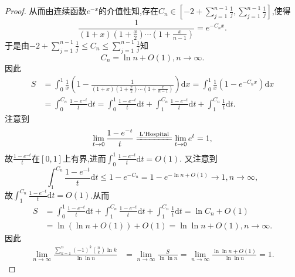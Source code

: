 \documentclass[../../main.tex]{subfiles}%
\begin{document}
\begin{proof}
从而由连续函数$e^{-x}$的介值性知,存在$C_n\in \left[ -2+\sum\limits_{j=1}^{n-1}{\frac{1}{j}},\sum\limits_{j=1}^{n-1}{\frac{1}{j}} \right]$,使得
$$\frac{1}{(1+x)\left(1+\frac{x}{2}\right)\cdots\left(1+\frac{x}{n-1}\right)}=e^{-C_nx}.$$
于是由$-2+\sum\limits_{j=1}^{n-1}{\frac{1}{j}}\leqslant C_n\leqslant \sum\limits_{j=1}^{n-1}{\frac{1}{j}}$知
$$C_n=\ln n+O(1),n\rightarrow \infty.$$
因此
\begin{align*}
S&=\int_0^1{\frac{1}{x}\left( 1-\frac{1}{(1+x)\left(1+\frac{x}{2}\right)\cdots\left(1+\frac{x}{n-1}\right)} \right) \mathrm{d}x}=\int_0^1{\frac{1}{x}\left( 1-e^{-C_nx} \right) \mathrm{d}x}
\\
&=\int_0^{C_n}{\frac{1-e^{-t}}{t}\mathrm{d}t}=\int_0^1{\frac{1-e^{-t}}{t}\mathrm{d}t}+\int_1^{C_n}{\frac{1-e^{-t}}{t}\mathrm{d}t}+\int_1^{C_n}{\frac{1}{t}\mathrm{d}t}.
\end{align*}
注意到
$$\lim_{t\rightarrow 0}\frac{1-e^{-t}}{t}\xlongequal{\text{L'Hospital}}\lim_{t\rightarrow 0}e^t=1,$$
故$\frac{1-e^{-t}}{t}$在$[0,1]$上有界,进而$\int_0^1{\frac{1-e^{-t}}{t}\mathrm{d}t}=O(1)$.
又注意到
$$\int_1^{C_n}{\frac{1-e^{-t}}{t}\mathrm{d}t}\leqslant 1-e^{-C_n}=1-e^{-\ln n+O(1)}\rightarrow 1,n\rightarrow \infty,$$
故$\int_1^{C_n}{\frac{1-e^{-t}}{t}\mathrm{d}t}=O(1)$.从而
\begin{align*}
S&=\int_0^1{\frac{1-e^{-t}}{t}\mathrm{d}t}+\int_1^{C_n}{\frac{1-e^{-t}}{t}\mathrm{d}t}+\int_1^{C_n}{\frac{1}{t}\mathrm{d}t}=\ln C_n+O(1)
\\
&=\ln \left( \ln n+O(1) \right) +O(1)=\ln\ln n+O(1),n\rightarrow \infty.
\end{align*}
因此
\begin{align*}
\lim_{n\rightarrow \infty}\frac{\sum\limits_{k=1}^n{(-1) ^k\binom{n}{k}\ln k}}{\ln\ln n}&=\lim_{n\rightarrow \infty}\frac{S}{\ln\ln n}=\lim_{n\rightarrow \infty}\frac{\ln\ln n+O(1)}{\ln\ln n}=1.
\end{align*}

\end{proof}
\end{document}
